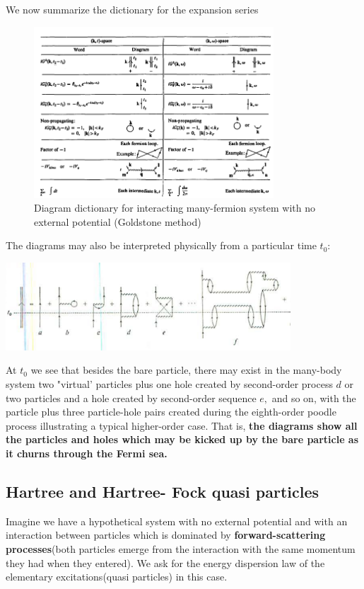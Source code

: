 We now summarize the dictionary for the expansion series
\begin{figure}
    \centering
    \includegraphics[width=0.8\textwidth]{screenshots/interacting-fermi-sys-dict.PNG}
    \caption{Diagram dictionary for interacting many-fermion system with no external potential (Goldstone method)}
    \label{fig:goldstone-interacting-fermi-dict}
\end{figure}
The diagrams may also be interpreted physically from a particular time $t_0$:
\begin{center}
    \includegraphics[width=0.8\textwidth]{screenshots/goldstone-particular-time.PNG}
\end{center}
At $t_{0}$ we see that besides the bare particle, there may exist in the many-body system two "virtual' particles plus one hole created by second-order process $d$ or two particles and a hole created by second-order sequence $e,$ and so on, with the particle plus three particle-hole pairs created during the eighth-order poodle process illustrating a typical higher-order case. That is, \textbf{the diagrams show all the particles and holes which may be kicked up by the bare particle as it churns through the Fermi sea.}
\subsection{Hartree and Hartree- Fock quasi particles}
Imagine we have a hypothetical system with no external potential and with an interaction between particles which is dominated by \textbf{forward-scattering processes}(both particles emerge from the interaction with the same momentum they had when they entered). We ask for the energy dispersion law of the elementary excitations(quasi particles) in this case.


